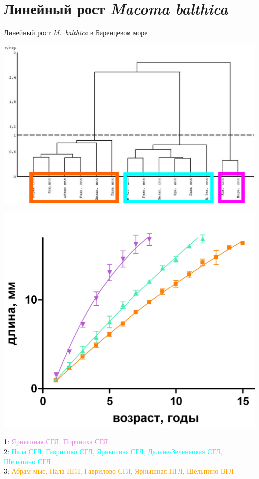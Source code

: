 \documentclass{beamer}
\begin{document}
		\section[Линейный рост]{Линейный рост {\it Macoma balthica}}
\begin{frame}{Линейный рост {\it M.~balthica} в Баренцевом море}
	\begin{minipage}[t]{.58\linewidth}
		\begin{center}
			\includegraphics[width=\textwidth]{./dendrogramma_sravnenie_rosta_linear_all_gorizonts.pdf}
		\end{center}
	\end{minipage}
%
	\begin{minipage}[t]{.4\linewidth}
		\begin{center}
			\includegraphics[width=\textwidth]{./rost_clusters_all_crop.jpg}
		\end{center}
	\end{minipage}

1: \textcolor{violet}{Ярнышная СГЛ, Порчниха СГЛ}\\
2: \textcolor{cyan}{Пала СГЛ, Гаврилово СГЛ, Ярнышная СГЛ, Дальне-Зеленецкая СГЛ, Шельпино СГЛ}\\
3: \textcolor{orange}{Абрам-мыс, Пала НГЛ, Гаврилово СГЛ, Ярнышная НГЛ, Шельпино ВГЛ}
\end{frame}
\end{document}
